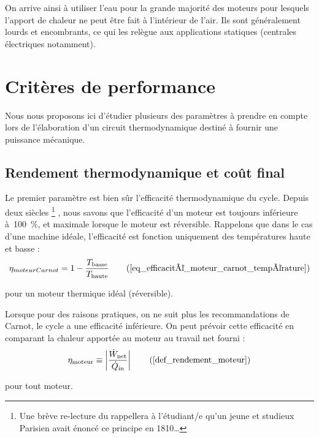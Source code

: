 	On arrive ainsi à utiliser l’eau pour la grande majorité des moteurs pour lesquels l’apport de chaleur ne peut être fait à l’intérieur de l’air. Ils sont généralement lourds et encombrants, ce qui les relègue aux applications statiques (centrales électriques notamment).


\section{Critères de performance}

	Nous nous proposons ici d’étudier plusieurs des paramètres à prendre en compte lors de l’élaboration d’un circuit thermodynamique destiné à fournir une puissance mécanique.


	\subsection{Rendement thermodynamique et coût final}

		Le premier paramètre est bien sûr l’efficacité thermodynamique du cycle. Depuis deux siècles%
			\footnote{Une brève re-lecture du \courssept rappellera à l’étudiant/e qu’un jeune et studieux Parisien avait énoncé ce principe en 1810…}%
			, nous savons que l’efficacité d’un moteur est toujours inférieure à~\SI{100}{\percent}, et maximale lorsque le moteur est réversible. Rappelons que dans le cas d’une machine idéale, l’efficacité est fonction uniquement des températures haute et basse :
		\begin{equation}
			\eta _{moteurCarnot} = 1 - \frac{T_\text{basse}}{T_\text{haute}}	\tag{\ref{eq_efficacité_moteur_carnot_température}}
		\end{equation}

		\begin{equationterms}
			\item pour un moteur thermique idéal (réversible).
		\end{equationterms}

		Lorsque pour des raisons pratiques, on ne suit plus les recommandations de Carnot, le cycle a une efficacité inférieure. On peut prévoir cette efficacité en comparant la chaleur apportée au moteur au travail net fourni :
		\begin{equation}
			\eta_\text{moteur} \equiv \left| \frac{\dot{W}_\text{net}}{\dot{Q}_\text{in}} \right| \tag{\ref{def_rendement_moteur}}
		\end{equation}

		\begin{equationterms}
			\item pour tout moteur.
		\end{equationterms}

